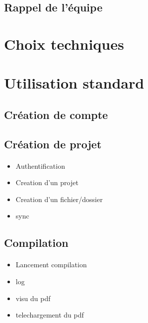 \documentclass[a4paper,12pt]{article}
\begin{document}
\subsection{Rappel de l'équipe}
\paragraph*{}

\section{Choix techniques}
\paragraph*{}

\section{Utilisation standard}
\subsection{Création de compte}
\paragraph*{}

\subsection{Création de projet}
\paragraph*{}
\begin{itemize}
 \item Authentification
 \item Creation d'un projet
 \item Creation d'un fichier/dossier
 \item sync
\end{itemize}


\subsection{Compilation}
\paragraph*{}
\begin{itemize}
 \item Lancement compilation
 \item log
 \item visu du pdf
 \item telechargement du pdf
\end{itemize}
\end{document}
